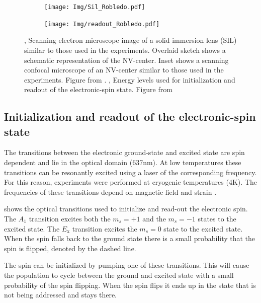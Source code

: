 \begin{figure}[htbp]
    \centering
    \begin{subfigure}[t]{0.49\textwidth}\centering
        \caption{}
        \label{fig:Sil_Robledo}
        \texttt{[image: Img/Sil\_Robledo.pdf]}
    \end{subfigure}
    \begin{subfigure}[t]{0.49\textwidth}\centering
       \caption{}
       \label{fig:readoutRobledo}
       \texttt{[image: Img/readout\_Robledo.pdf]}
   \end{subfigure}
   \caption{, Scanning electron microscope image of  a solid immersion lens (SIL) similar to those used in the experiments. Overlaid sketch shows a schematic representation of the NV-center. Inset shows a scanning confocal microscope of an NV-center similar to those used in the experiments. Figure from \citep{Robledo2011HighFidelity}.  , Energy levels used for initialization and readout of the electronic-spin state. Figure from \citep{Robledo2011HighFidelity}}
\end{figure}

\subsection{Initialization and readout of the electronic-spin state}
The transitions between the electronic ground-state and excited state are spin dependent and lie in the optical domain (637nm).
At low temperatures these transitions can be resonantly excited using a laser of the corresponding frequency.
For this reason, experiments were performed at cryogenic temperatures (4K).
The frequencies of these transitions depend on magnetic field and strain \citep{Hensen2011MeasurementBased}.

 shows the optical transitions used to initialize and read-out the electronic spin.
The $A_1$ transition excites both the $m_s =+1$ and the $m_s=-1$ states to the excited state.
The $E_\mathrm{x}$ transition excites the $m_s = 0$ state to the excited state.
When the spin falls back to the ground state there is a small probability that the spin is flipped, denoted by the dashed line.

The spin can be initialized by pumping one of these transitions\citep{Robledo2011HighFidelity}.
This will cause the population to cycle between the ground and excited state with a small probability of the spin flipping.
When the spin flips it ends up in the state that is not being addressed and stays there.

